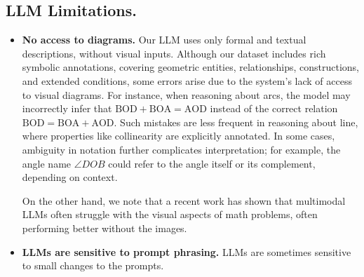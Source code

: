 \subsection*{LLM Limitations.}

\begin{itemize}
  \item \textbf{No access to diagrams.}
  Our LLM uses only formal and textual descriptions, without visual inputs.
  Although our dataset includes rich symbolic annotations, covering geometric entities, relationships, constructions, and extended conditions, some errors arise due to the system's lack of access to visual diagrams. For instance, when reasoning about arcs, the model may incorrectly infer that $\mathrm{BOD} + \mathrm{BOA} = \mathrm{AOD}$ instead of the correct relation $\mathrm{BOD} = \mathrm{BOA} + \mathrm{AOD}$. 
  Such mistakes are less frequent in  reasoning about line, where properties like collinearity are explicitly annotated. In some cases, ambiguity in notation further complicates interpretation; for example, the angle name $\angle DOB$ could refer to the angle itself or its complement, depending on context.
  
  On the other hand, we note that a recent work \cite{zhang2024mathverse} has shown that multimodal LLMs often struggle with the visual aspects of math problems, often performing better without the images.


    




    \item \textbf{LLMs are sensitive to prompt phrasing.}
    LLMs are sometimes sensitive to small changes to the prompts.
\end{itemize}
